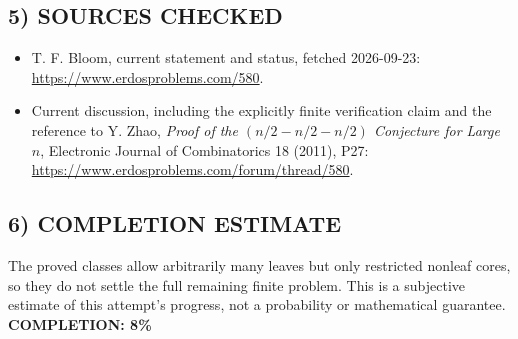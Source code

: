 \subsection{5) SOURCES CHECKED}
\begin{itemize}
\item T. F. Bloom, current statement and status, fetched 2026-09-23: \url{https://www.erdosproblems.com/580}.
\item Current discussion, including the explicitly finite verification claim and the reference to Y. Zhao, \emph{Proof of the $(n/2-n/2-n/2)$ Conjecture for Large $n$}, Electronic Journal of Combinatorics 18 (2011), P27: \url{https://www.erdosproblems.com/forum/thread/580}.
\end{itemize}

\subsection{6) COMPLETION ESTIMATE}
The proved classes allow arbitrarily many leaves but only restricted nonleaf cores, so they do not settle the full remaining finite problem. This is a subjective estimate of this attempt's progress, not a probability or mathematical guarantee.
\textbf{COMPLETION: 8\%}
